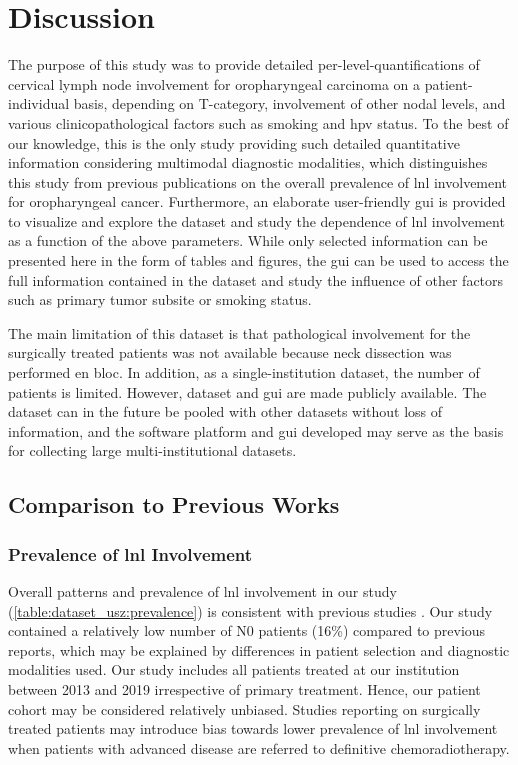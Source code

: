 \documentclass[\relativeRoot/main.tex]{subfiles}
\begin{document}
\section{Discussion}
\label{sec:dataset_usz:discussion}

The purpose of this study was to provide detailed per-level-quantifications of cervical lymph node involvement for oropharyngeal carcinoma on a patient-individual basis, depending on T-category, involvement of other nodal levels, and various clinicopathological factors such as smoking and \gls{hpv} status. To the best of our knowledge, this is the only study providing such detailed quantitative information considering multimodal diagnostic modalities, which distinguishes this study from previous publications on the overall prevalence of \gls{lnl} involvement for oropharyngeal cancer. Furthermore, an elaborate user-friendly \gls{gui} is provided to visualize and explore the dataset and study the dependence of \gls{lnl} involvement as a function of the above parameters. While only selected information can be presented here in the form of tables and figures, the \gls{gui} can be used to access the full information contained in the dataset and study the influence of other factors such as primary tumor subsite or smoking status.

The main limitation of this dataset is that pathological involvement for the surgically treated patients was not available because neck dissection was performed en bloc. In addition, as a single-institution dataset, the number of patients is limited. However, dataset and \gls{gui} are made publicly available. The dataset can in the future be pooled with other datasets without loss of information, and the software platform and \gls{gui} developed may serve as the basis for collecting large multi-institutional datasets.

\subsection*{Comparison to Previous Works}

\subsubsection*{Prevalence of \gls{lnl} Involvement}

Overall patterns and prevalence of \gls{lnl} involvement in our study (\cref{table:dataset_usz:prevalence}) is consistent with previous studies \cite{candela_patterns_1990,gregoire_selection_2000,iyizoba-ebozue_retropharyngeal_2020}. Our study contained a relatively low number of N0 patients (16\%) compared to previous reports, which may be explained by differences in patient selection and diagnostic modalities used. Our study includes all patients treated at our institution between 2013 and 2019 irrespective of primary treatment. Hence, our patient cohort may be considered relatively unbiased. Studies reporting on surgically treated patients may introduce bias towards lower prevalence of \gls{lnl} involvement when patients with advanced disease are referred to definitive chemoradiotherapy.
\end{document}
